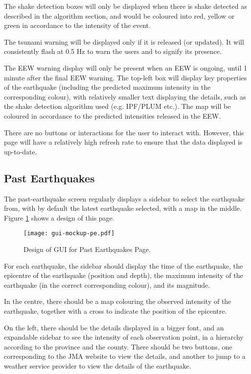 The shake detection boxes will only be displayed when there is shake detected as described in the algorithm section, and would be coloured into red, yellow or green in accordance to the intensity of the event.

The tsunami warning will be displayed only if it is released (or updated). It will consistently flash at 0.5 Hz to warn the users and to signify its presence.

The EEW warning display will only be present when an EEW is ongoing, until 1 minute after the final EEW warning. The top-left box will display key properties of the earthquake (including the predicted maximum intensity in the corresponding colour), with relatively smaller text displaying the details, such as the shake detection algorithm used (e.g. IPF/PLUM etc.). The map will be coloured in accordance to the predicted intensities released in the EEW.

There are no buttons or interactions for the user to interact with. However, this page will have a relatively high refresh rate to ensure that the data displayed is up-to-date.

\subsection{Past Earthquakes}

The past-earthquake screen regularly displays a sidebar to select the earthquake from, with by default the latest earthquake selected, with a map in the middle. Figure \ref{fig:gui-mockup-pe} shows a design of this page.

\begin{figure}[!ht]
    \centering
    \texttt{[image: gui-mockup-pe.pdf]}
    \caption{Design of GUI for Past Earthquakes Page.}
    \label{fig:gui-mockup-pe}
\end{figure}

For each earthquake, the sidebar should display the time of the earthquake, the epicentre of the earthquake (position and depth), the maximum intensity of the earthquake (in the correct corresponding colour), and its magnitude.

In the centre, there should be a map colouring the observed intensity of the earthquake, together with a cross to indicate the position of the epicentre.

On the left, there should be the details displayed in a bigger font, and an expandable sidebar to see the intensity of each observation point, in a hierarchy according to the province and the county. There should be two buttons, one corresponding to the JMA website to view the details, and another to jump to a weather service provider to view the details of the earthquake.

